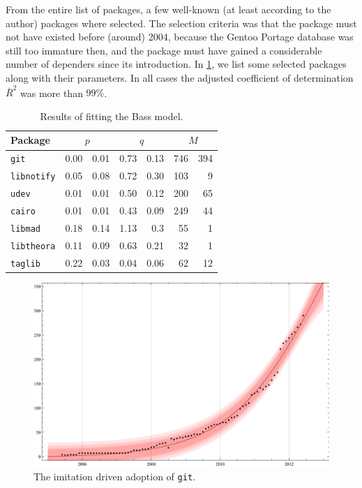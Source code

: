 \documentclass[smallextended,final]{svjour3}
\begin{document}
From the entire list of packages, a few well-known (at least according to the author) packages where selected. The selection criteria was that the package must not have existed before (around) 2004, because the Gentoo Portage database was still too immature then, and the package must have gained a considerable number of dependers since its introduction. In \ref{tbl:results}, we list some selected packages along with their parameters. In all cases the adjusted coefficient of determination $\bar{R}^2$ was more than $99\%$.

\begin{table}
\centering
\caption{Results of fitting the Bass model.}\label{tbl:results}
\begin{tabular}{lr@{ $\pm$}rr@{ $\pm$}rr@{ $\pm$}r}
\toprule
Package & \multicolumn{2}{c}{$p$} & \multicolumn{2}{c}{$q$} & \multicolumn{2}{c}{$M$} \\
\midrule
\texttt{git}         & 0.00 & 0.01    & 0.73 & 0.13   & 746 & 394 \\
\texttt{libnotify}   & 0.05 & 0.08    & 0.72 & 0.30   & 103 &   9 \\
\texttt{udev}        & 0.01 & 0.01    & 0.50 & 0.12   & 200 &  65 \\
\texttt{cairo}       & 0.01 & 0.01    & 0.43 & 0.09   & 249 &  44 \\
\texttt{libmad}      & 0.18 & 0.14    & 1.13 & 0.3    &  55 &   1 \\
\texttt{libtheora}   & 0.11 & 0.09    & 0.63 & 0.21   &  32 &   1 \\
\texttt{taglib}      & 0.22 & 0.03    & 0.04 & 0.06   &  62 &  12 \\
\bottomrule
\end{tabular}
\end{table}

\begin{figure}
\centering
\includegraphics[width=\linewidth]{BassFit-git2.pdf}
\vspace{-2em}
\caption{The imitation driven adoption of \texttt{git}.}\label{fig:git}
\vspace{-1.5em}
\end{figure}
\end{document}
